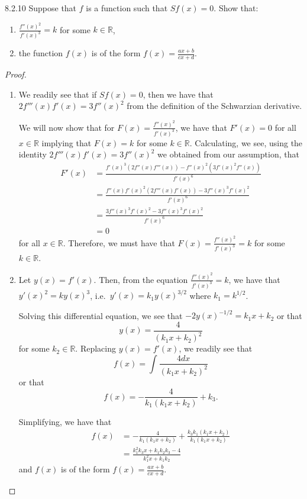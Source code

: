 \begin{problem}{8.2.10}
  Suppose that $f$ is a function such that $Sf(x) = 0$. Show that:
  \begin{enumerate}
    \item $\displaystyle \frac{f''(x)^2}{f'(x)^3} = k$ for some $k\in\mathbb{R}$,
    \item the function $f(x)$ is of the form $\displaystyle f(x) = \frac{ax + b}{cx+d}$.
  \end{enumerate}
\end{problem}

\begin{proof}
  \begin{enumerate}
    \item We readily see that if $Sf(x) = 0$, then we have that $2f'''(x)f'(x) = 3f''(x)^2$
      from the definition of the Schwarzian derivative.

      We will now show that for $F(x) = \displaystyle \frac{f''(x)^2}{f'(x)^3}$, we have that $F'(x) = 0$ for all $x\in\mathbb{R}$ implying that
      $F(x) = k$ for some $k\in\mathbb{R}$. Calculating, we see, using the identity $2f'''(x)f'(x) = 3f''(x)^2$
      we obtained from our assumption, that
      \begin{align*}
        F'(x) &= \frac{f'(x)^3\left( 2f''(x)f'''(x) \right) - f''(x)^2\left( 3 f'(x)^2f''(x) \right)}{f'(x)^6} \\
        &= \frac{f''(x)f'(x)^2 (2f'''(x)f'(x)) - 3f''(x)^3f'(x)^2}{f'(x)^6} \\
        &= \frac{3f''(x)^3f'(x)^2 - 3f''(x)^3f'(x)^2}{f'(x)^6} \\
        &= 0
      \end{align*}
      for all $x\in\mathbb{R}$. Therefore, we must have that $F(x) = \displaystyle \frac{f''(x)^2}{f'(x)^3} = k$
      for some $k\in\mathbb{R}$.

    \item Let $y(x) = f'(x)$. Then, from the equation $\displaystyle \frac{f''(x)^2}{f'(x)^3} = k$,
      we have that $y'(x)^2 = ky(x)^3$, i.e.\ $y'(x) = k_1y(x)^{3/2}$ where $k_1 = k^{1/2}$.

      Solving this differential equation, we see that $-2y(x)^{-1/2} = k_1x + k_2$ or that
      $$y(x) = \frac{4}{(k_1x + k_2)^2}$$
      for some $k_2\in\mathbb{R}$. Replacing $y(x) = f'(x)$, we readily see that
      $$f(x) = \int \frac{4dx}{(k_1x + k_2)^2}$$
      or that
      $$f(x) = -\frac{4}{k_1(k_1 x + k_2)} + k_3.$$

      Simplifying, we have that
      \begin{align*}
        f(x) &= -\frac{4}{k_1(k_1 x + k_2)} + \frac{k_3k_1(k_1 x + k_2)}{k_1(k_1 x + k_2)}\\
        &= \frac{k_1^2 k_3 x + k_1k_2k_3 - 4}{k_1^2 x + k_1k_2}
      \end{align*}
      and $f(x)$ is of the form $\displaystyle f(x) = \frac{ax + b}{cx+d}$.
  \end{enumerate}
\end{proof}
\newpage
